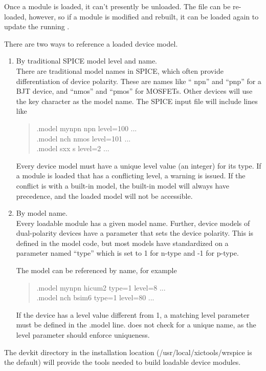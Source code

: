 Once a module is loaded, it can't presently be unloaded.  The file can
be re-loaded, however, so if a module is modified and rebuilt, it can
be loaded again to update the running {\WRspice}.

There are two ways to reference a loaded device model.
\begin{enumerate}
\item{By traditional SPICE model level and name.\\
There are traditional model names in SPICE, which often provide
differentiation of device polarity.  These are names like ``{\vt
npn}'' and ``{\vt pnp}'' for a BJT device, and ``{\vt nmos}'' and
``{\vt pmos}'' for MOSFETs.  Other devices will use the key character
as the model name.  The SPICE input file will include lines like
\begin{quote}
{\vt .model mynpn npn level=100 ...}\\
{\vt .model nch nmos level=101 ...}\\
{\vt .model sxx s level=2 ...}
\end{quote}
Every device model must have a unique {\vt level} value (an integer)
for its type.  If a module is loaded that has a conflicting level, a
warning is issued.  If the conflict is with a built-in model, the
built-in model will always have precedence, and the loaded model will
not be accessible.}

\item{By model name.\\
Every loadable module has a given model name.  Further, device models
of dual-polarity devices have a parameter that sets the device
polarity.  This is defined in the model code, but most models have
standardized on a parameter named ``{\vt type}'' which is set to 1 for
n-type and -1 for p-type.

The model can be referenced by name, for example
\begin{quote}
{\vt .model mynpn hicum2 type=1 level=8 ...}\\
{\vt .model nch bsim6 type=1 level=80 ...}
\end{quote}
If the device has a level value different from 1, a matching level
parameter must be defined in the {\vt .model} line.  {\WRspice} does
not check for a unique name, as the level parameter should enforce
uniqueness.}
\end{enumerate}

The {\vt devkit} directory in the {\WRspice} installation location
({\vt /usr/local/xictools/wrspice} is the default) will provide
the tools needed to build loadable device modules.

